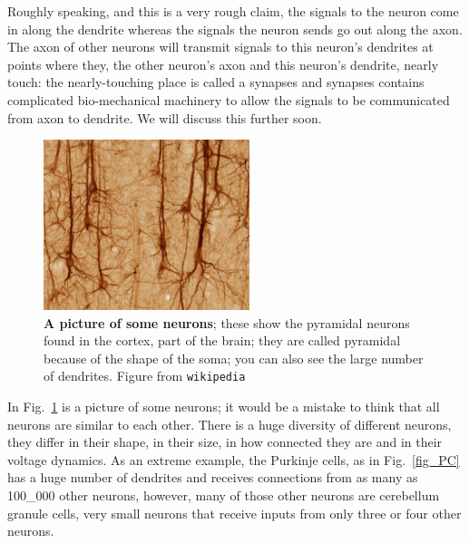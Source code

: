 \documentclass[12pt]{article}
\begin{document}
Roughly speaking, and this is a very rough claim, the signals to the
neuron come in along the dendrite whereas the signals the neuron sends
go out along the axon. The axon of other neurons will transmit signals
to this neuron's dendrites at points where they, the other neuron's
axon and this neuron's dendrite, nearly touch: the nearly-touching
place is called a synapses and synapses contains complicated
bio-mechanical machinery to allow the signals to be communicated from
axon to dendrite. We will discuss this further soon.

\begin{figure}[tbhp]
  \begin{center}
  \includegraphics[width=6cm]{Smi32neuron.jpg}
\end{center}
  \caption{\textbf{A picture of some neurons}; these show the
    pyramidal neurons found in the cortex, part of the brain; they are
    called pyramidal because of the shape of the soma; you can also see the large number of dendrites. Figure from
    \texttt{wikipedia}\label{fig_real_neuron}}
\end{figure}

In Fig.~\ref{fig_real_neuron} is a picture of some neurons; it would
be a mistake to think that all neurons are similar to each
other. There is a huge diversity of different neurons, they differ in
their shape, in their size, in how connected they are and in their
voltage dynamics. As an extreme example, the Purkinje cells, as in
Fig.~\ref{fig_PC} has a huge number of dendrites and receives
connections from as many as 100\_000 other neurons, however, many of
those other neurons are cerebellum granule cells, very small neurons
that receive inputs from only three or four other neurons. 
\end{document}
